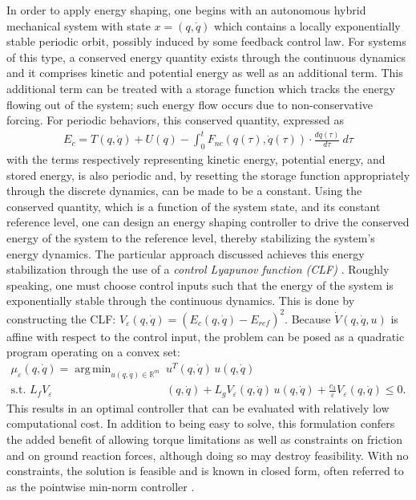 \documentclass[english]{article}
\DeclareMathOperator*{\argmin}{arg\,min}
\begin{document}
%
%
In order to apply energy shaping, one begins with an autonomous hybrid
mechanical system with state $x = (q, {\dot q})$ which contains a locally
exponentially stable periodic orbit, possibly induced by some feedback control
law.
%
For systems of this type, a conserved energy quantity exists through the
continuous dynamics and it comprises kinetic and potential energy as well as an
additional term.
%
This additional term can be treated with a storage function which tracks the
energy flowing out of the system; such energy flow occurs due to
non-conservative forcing.
%
For periodic behaviors, this conserved quantity, expressed as
\begin{align*}
  E_{c} = T(q, {\dot q}) + U(q) - \int_{0}^{t} \! F_{\mathit{nc}}(q(\tau), {\dot
    q}(\tau)) \cdot \frac{dq(\tau)}{d\tau} \ d\tau
\end{align*}
with the terms respectively representing kinetic energy, potential energy, and
stored energy, is also periodic and, by resetting the storage function
appropriately through the discrete dynamics, can be made to be a constant.
%
Using the conserved quantity, which is a function of the system state, and its
constant reference level, one can design an energy shaping controller to drive
the conserved energy of the system to the reference level, thereby stabilizing
the system's energy dynamics.
%
The particular approach discussed achieves this energy stabilization through the
use of a {\em control Lyapunov function (CLF)} \cite{Freeman1996}.
%
Roughly speaking, one must choose control inputs such that the energy of the
system is exponentially stable through the continuous dynamics.
%
This is done by constructing the CLF: $V_{\varepsilon}(q, {\dot q}) = (E_{c}(q,
{\dot q}) - E_{\mathit{ref}})^{2}$.
%
Because ${\dot V}(q, {\dot q}, u)$ is affine with respect to the control input,
the problem can be posed as a quadratic program operating on a convex set:
\begin{align*}
  \mu_{\varepsilon}(q, {\dot q}) = \argmin_{u(q, {\dot q}) \in \mathbb{R}^{m}} \
  & u^T(q, {\dot q}) \, u(q, {\dot q})\\
  \mbox{s.t. } L_{f} V_{\varepsilon} &(q, {\dot q}) + L_{g} V_{\varepsilon}(q,
  {\dot q}) \, u(q, {\dot q}) +
  \frac{c_{3}}{\varepsilon} V_{\varepsilon}(q, {\dot q}) \leq 0.
\end{align*}
This results in an optimal controller that can be evaluated with relatively low
computational cost.
%
In addition to being easy to solve, this formulation confers the added benefit
of allowing torque limitations as well as constraints on friction and on ground
reaction forces, although doing so may destroy feasibility.
%
With no constraints, the solution is feasible and is known in closed form, often
referred to as the pointwise min-norm controller \cite{Freeman1996}.
\end{document}
